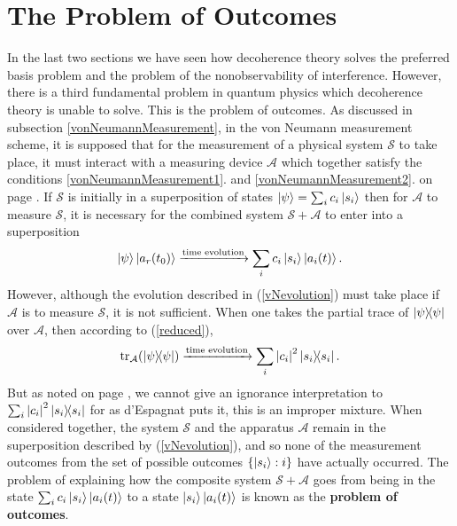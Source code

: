     \section{The Problem of Outcomes}\label{probOutcomes}
    In the last two sections we have seen how decoherence theory solves the preferred basis problem and the problem of the nonobservability of interference. However, there is a third fundamental problem in quantum physics which decoherence theory is unable to solve. This is the problem of outcomes. As discussed in subsection \ref{vonNeumannMeasurement}, in the von Neumann measurement scheme, it is supposed that for the measurement of a physical system $\mathcal{S}$ to take place, it must interact with a measuring device $\mathcal{A}$ which together satisfy the conditions \ref{vonNeumannMeasurement1}. and \ref{vonNeumannMeasurement2}. on page \pageref{vonNeumannMeasurement1}. If $\mathcal{S}$ is initially in a superposition of states $\ket{\psi}=\sum_i c_i\ket{s_i}$ then for $\mathcal{A}$ to measure $\mathcal{S}$, it is necessary for the combined system $\mathcal{S}+\mathcal{A}$ to enter into a superposition
    \begin{equation}\label{vNevolution}
    \ket{\psi}\ket{a_r(t_0)}\xrightarrow{\text{time evolution}}\sum_i c_i\ket{s_i}\ket{a_i(t)}.
    \end{equation}
    However, although the evolution described in (\ref{vNevolution}) must take place if $\mathcal{A}$ is to measure $\mathcal{S}$, it is not sufficient. When one takes the partial trace of $\dyad{\psi}$ over $\mathcal{A}$, then according to (\ref{reduced}),
    \begin{equation}\label{vNevolution2}
    \tr_\mathcal{A}(\dyad{\psi})\xrightarrow{\text{time evolution}}\sum_i \abs{c_i}^2\dyad{s_i}.
    \end{equation}
    But as noted on page \pageref{Espagnat}, we cannot give an ignorance interpretation to $\sum_i \abs{c_i}^2\dyad{s_i}$ for as d'Espagnat puts it, this is an improper mixture. When considered together, the system $\mathcal{S}$ and the apparatus $\mathcal{A}$ remain in the superposition described by (\ref{vNevolution}), and so none of the measurement outcomes from the set of possible outcomes $\{\ket{s_i}:i\}$ have actually occurred. The problem of explaining how the composite system   $\mathcal{S}+\mathcal{A}$       goes from being in the state $\sum_i c_i\ket{s_i}\ket{a_i(t)}$ to a state $\ket{s_i}\ket{a_i(t)}$ is known as the \textbf{problem of outcomes}. 
    
   